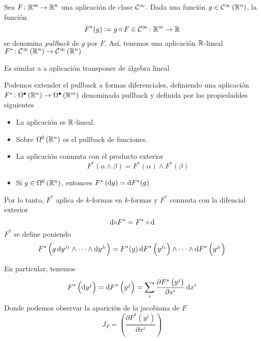 \begin{defi}
    Sea $F \colon \mathbb{R}^m \to \mathbb{R}^n$ una aplicación de clase $\mathcal{C}^\infty$. Dada una función $g \in \mathcal{C}^\infty\left( \mathbb{R}^n \right)$, la función
    \[
        F^\ast(g) := g \circ F \in \mathcal{C}^\infty \colon \mathbb{R}^m \to \mathbb{R}
    \]
    se denomina \emph{pullback} de $g$ por $F$. Así, tenemos una aplicación $\mathbb{R}$-lineal $F^\ast \colon \mathcal{C}^\infty \left( \mathbb{R}^n \right)
    \to \mathcal{C}^\infty \left( \mathbb{R}^n \right)$
\end{defi}
\begin{obs*}
    Es similar a a aplicación transponer de álgebra lineal
\end{obs*}

\begin{defi}
    Podemos extender el pullback a formas diferenciales, definiendo una aplicación $F^\ast \colon \Omega^\bullet \left( \mathbb{R}^n \right) \to
    \Omega^\bullet\left( \mathbb{R}^m \right)$ denominada pullback y definida por las propiedaddes siguientes
    \begin{itemize}
        \item La aplicación es $\mathbb{R}$-lineal.
        \item Sobre $\Omega^0\left( \mathbb{R}^n \right)$ es el pullback de funciones.
        \item La aplicación conmuta con el producto exterior
            \[
                F^\ast(\alpha \wedge \beta) = F^\ast(\alpha) \wedge F^\ast(\beta)
            \]
        \item Si $g \in \Omega^0 \left( \mathbb{R}^n \right)$, entonces $F^\ast\left( \dif g \right) = \dif F^\ast(g)$
    \end{itemize}
    Por lo tanto, $F^\ast$ aplica de $k$-formas en $k$-formas y $F^\ast$ conmuta con la difencial exterior
    \[
        \dif \circ F^\ast = F^\ast \circ \dif
    \]
    $F^\ast$ se define poniendo
    \[
        F^\ast\left( g \dif y^{j_1} \wedge \cdots \wedge \dif y^{j_l} \right) = F^\ast(g)\dif F^\ast\left( y^{j_1} \right) \wedge
        \cdots \wedge \dif F^\ast\left( y^{j_l} \right)
    \]
\end{defi}

\begin{obs}
    En particular, tenemos
    \[
        F^\ast \left( \dif y^j \right) = \dif F^\ast\left( y^j \right) =
        \sum_i \frac{\partial F^\ast\left( y^j \right)}{\partial x^i} \dif x^i
    \]
    Donde podemos observar la aparición de la jacobiana de $F$
    \[
        J_F = \left( \frac{\partial F^\ast \left( y^j \right)}{\partial x^i} \right)
    \]
\end{obs}

